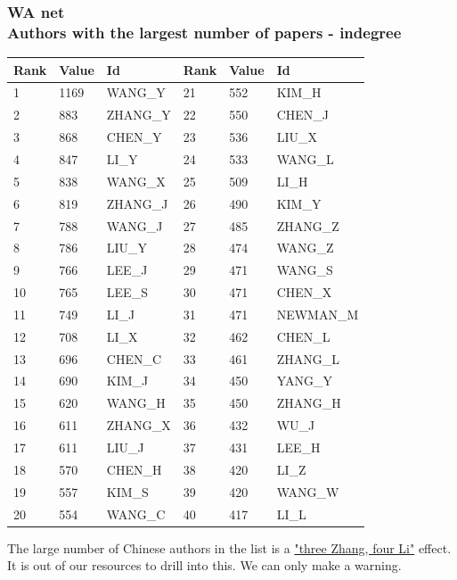 \documentclass[hyperref={pdfstartview={FitBH -32768},
                         pdfpagemode=FullScreen,
                         plainpages=false,
                         colorlinks=true}
              ]{beamer}
\begin{document}
\begin{frame}[fragile]
\frametitle{WA net \label{numpap}\\ \normalsize Authors with the largest number of papers - indegree}

\renewcommand{\arraystretch}{0.82}
\tiny
\begin{center}
\begin{tabular}{l|l|l||l|l|l}
Rank& 	Value& 	Id& 	Rank& 	Value& 	Id\\  \hline   
1& 	1169& 	WANG\_Y& 	21& 	552& 	KIM\_H\\ 
2& 	883& 	ZHANG\_Y& 	22& 	550& 	CHEN\_J\\ 
3& 	868& 	CHEN\_Y& 	23& 	536& 	LIU\_X\\ 
4& 	847& 	LI\_Y& 	24& 	533& 	WANG\_L\\ 
5& 	838& 	WANG\_X& 	25& 	509& 	LI\_H\\ 
6& 	819& 	ZHANG\_J& 	26& 	490& 	KIM\_Y\\ 
7& 	788& 	WANG\_J& 	27& 	485& 	ZHANG\_Z\\ 
8& 	786& 	LIU\_Y& 	28& 	474& 	WANG\_Z\\ 
9& 	766& 	LEE\_J& 	29& 	471& 	WANG\_S\\ 
10& 	765& 	LEE\_S& 	30& 	471& 	CHEN\_X\\ 
11& 	749& 	LI\_J& 	31& 	471& 	NEWMAN\_M\\ 
12& 	708& 	LI\_X& 	32& 	462& 	CHEN\_L\\ 
13& 	696& 	CHEN\_C& 	33& 	461& 	ZHANG\_L\\ 
14& 	690& 	KIM\_J& 	34& 	450& 	YANG\_Y\\ 
15& 	620& 	WANG\_H& 	35& 	450& 	ZHANG\_H\\ 
16& 	611& 	ZHANG\_X& 	36& 	432& 	WU\_J\\ 
17& 	611& 	LIU\_J& 	37& 	431& 	LEE\_H\\ 
18& 	570& 	CHEN\_H& 	38& 	420& 	LI\_Z\\ 
19& 	557& 	KIM\_S& 	39& 	420& 	WANG\_W\\ 
20& 	554& 	WANG\_C& 	40& 	417& 	LI\_L\\ \hline  
\end{tabular}
\end{center}

\medskip
\footnotesize
The large number of Chinese authors in the list is a \href{https://en.wikipedia.org/wiki/List_of_common_Chinese_surnames}{"three Zhang, four Li"} effect. It is out of our resources to drill into this. We can only make a warning.

\end{frame}
\end{document}
